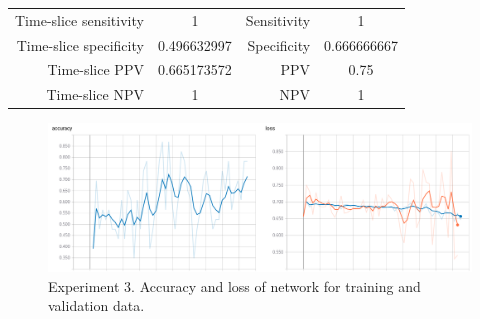 \documentclass[a4paper,fleqn]{cas-dc}
\begin{document}
\begin{table}
{\begin{tabular}{ | c | c | c | c | c | c | c | c | }
		\multicolumn{2}{|r|}{Time-slice sensitivity} & 
		\multicolumn{2}{c|}{ 1 } &
		\multicolumn{2}{|r|}{Sensitivity} & 
		\multicolumn{2}{c|}{ 1 } \\ 
		
		\multicolumn{2}{|r|}{Time-slice specificity} & 
		\multicolumn{2}{c|}{ 0.496632997 } &
		\multicolumn{2}{|r|}{Specificity} & 
		\multicolumn{2}{c|}{ 0.666666667 } \\ 
		
		\multicolumn{2}{|r|}{Time-slice PPV} & 
		\multicolumn{2}{c|}{ 0.665173572 } &
		\multicolumn{2}{|r|}{PPV} & 
		\multicolumn{2}{c|}{ 0.75 } \\ 
		
		\multicolumn{2}{|r|}{Time-slice NPV} & 
		\multicolumn{2}{c|}{ 1 } &
		\multicolumn{2}{|r|}{NPV} & 
		\multicolumn{2}{c|}{ 1 } \\ \hline
	\end{tabular}
}
\label{table:tests_3}
\end{table}
\begin{figure}
\includegraphics[width=\linewidth]{images/tests_3}
\caption{Experiment 3. Accuracy and loss of network for training and validation data.}
\label{fig:tests_3}
\end{figure}
\end{document}
